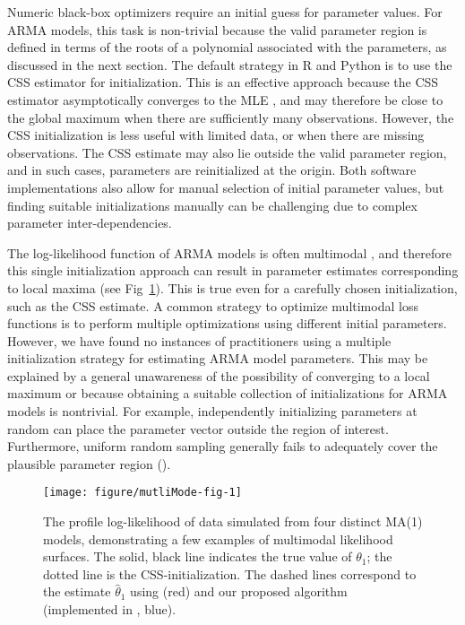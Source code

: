 Numeric black-box optimizers require an initial guess for parameter values.
For ARMA models, this task is non-trivial because the valid parameter region is defined in terms of the roots of a polynomial associated with the parameters, as discussed in the next section.
The default strategy in R and Python is to use the CSS estimator for initialization.
This is an effective approach because the CSS estimator asymptotically converges to the MLE \cite{shumway2017}, and may therefore be close to the global maximum when there are sufficiently many observations.
However, the CSS initialization is less useful with limited data, or when there are missing observations.
The CSS estimate may also lie outside the valid parameter region, and in such cases, parameters are reinitialized at the origin.
Both software implementations also allow for manual selection of initial parameter values, but finding suitable initializations manually can be challenging due to complex parameter inter-dependencies.

The log-likelihood function of ARMA models is often multimodal \cite{ripley2002}, and therefore this single initialization approach can result in parameter estimates corresponding to local maxima (see Fig~\ref{fig:multiMode}).
This is true even for a carefully chosen initialization, such as the CSS estimate.
A common strategy to optimize multimodal loss functions is to perform multiple optimizations using different initial parameters.
However, we have found no instances of practitioners using a multiple initialization strategy for estimating ARMA model parameters.
This may be explained by a general unawareness of the possibility of converging to a local maximum or because obtaining a suitable collection of initializations for ARMA models is nontrivial.
For example, independently initializing parameters at random can place the parameter vector outside the region of interest.
Furthermore, uniform random sampling generally fails to adequately cover the plausible parameter region ().




\begin{figure}[ht]
\begin{knitrout}
\color{fgcolor}

{\centering \texttt{[image: figure/mutliMode-fig-1]} 

}


\end{knitrout}
\caption{\label{fig:multiMode}The profile log-likelihood of data simulated from four distinct MA(1) models, demonstrating a few examples of multimodal likelihood surfaces. The solid, black line indicates the true value of $\theta_1$; the dotted line is the CSS-initialization. The dashed lines correspond to the estimate $\hat{\theta}_1$ using  (red) and our proposed algorithm (implemented in , blue).}
\end{figure}


